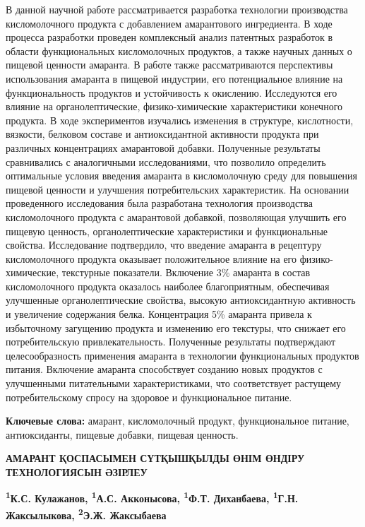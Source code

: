 В данной научной работе рассматривается разработка технологии
производства кисломолочного продукта с добавлением амарантового
ингредиента. В ходе процесса разработки проведен комплексный анализ
патентных разработок в области функциональных кисломолочных продуктов, а
также научных данных о пищевой ценности амаранта. В работе также
рассматриваются перспективы использования амаранта в пищевой индустрии,
его потенциальное влияние на функциональность продуктов и устойчивость к
окислению. Исследуются его влияние на органолептические,
физико-химические характеристики конечного продукта. В ходе
экспериментов изучались изменения в структуре, кислотности, вязкости,
белковом составе и антиоксидантной активности продукта при различных
концентрациях амарантовой добавки. Полученные результаты сравнивались с
аналогичными исследованиями, что позволило определить оптимальные
условия введения амаранта в кисломолочную среду для повышения пищевой
ценности и улучшения потребительских характеристик. На основании
проведенного исследования была разработана технология производства
кисломолочного продукта с амарантовой добавкой, позволяющая улучшить его
пищевую ценность, органолептические характеристики и функциональные
свойства. Исследование подтвердило, что введение амаранта в рецептуру
кисломолочного продукта оказывает положительное влияние на его
физико-химические, текстурные показатели. Включение 3\% амаранта в
состав кисломолочного продукта оказалось наиболее благоприятным,
обеспечивая улучшенные органолептические свойства, высокую
антиоксидантную активность и увеличение содержания белка. Концентрация
5\% амаранта привела к избыточному загущению продукта и изменению его
текстуры, что снижает его потребительскую привлекательность. Полученные
результаты подтверждают целесообразность применения амаранта в
технологии функциональных продуктов питания. Включение амаранта
способствует созданию новых продуктов с улучшенными питательными
характеристиками, что соответствует растущему потребительскому спросу на
здоровое и функциональное питание.

{\bfseries Ключевые слова:} амарант, кисломолочный продукт, функциональное
питание, антиоксиданты, пищевые добавки, пищевая ценность.

\begin{articleheader}
{\bfseries АМАРАНТ ҚОСПАСЫМЕН СҮТҚЫШҚЫЛДЫ ӨНІМ ӨНДІРУ ТЕХНОЛОГИЯСЫН ӘЗІРЛЕУ}

{\bfseries
\textsuperscript{1}К.С. Кулажанов,
\textsuperscript{1}А.С. Акконысова\textsuperscript{\envelope },
\textsuperscript{1}Ф.Т. Диханбаева,
\textsuperscript{1}Г.Н. Жаксылыкова,
\textsuperscript{2}Э.Ж. Жаксыбаева}
\end{articleheader}

